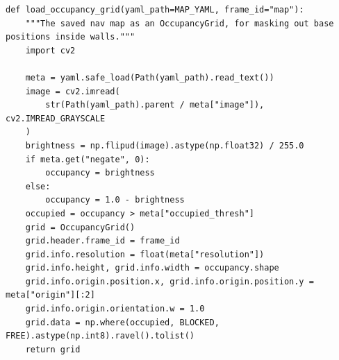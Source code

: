 \documentclass[11pt,a4paper]{book}
\begin{document}
\begin{lstlisting}[firstnumber=91]
def load_occupancy_grid(yaml_path=MAP_YAML, frame_id="map"):
    """The saved nav map as an OccupancyGrid, for masking out base positions inside walls."""
    import cv2

    meta = yaml.safe_load(Path(yaml_path).read_text())
    image = cv2.imread(
        str(Path(yaml_path).parent / meta["image"]), cv2.IMREAD_GRAYSCALE
    )
    brightness = np.flipud(image).astype(np.float32) / 255.0
    if meta.get("negate", 0):
        occupancy = brightness
    else:
        occupancy = 1.0 - brightness
    occupied = occupancy > meta["occupied_thresh"]
    grid = OccupancyGrid()
    grid.header.frame_id = frame_id
    grid.info.resolution = float(meta["resolution"])
    grid.info.height, grid.info.width = occupancy.shape
    grid.info.origin.position.x, grid.info.origin.position.y = meta["origin"][:2]
    grid.info.origin.orientation.w = 1.0
    grid.data = np.where(occupied, BLOCKED, FREE).astype(np.int8).ravel().tolist()
    return grid


\end{lstlisting}
\end{document}
